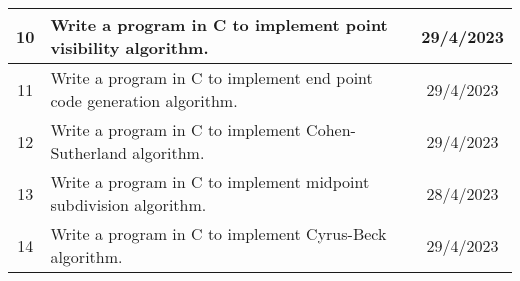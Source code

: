 \documentclass{article}
\begin{document}
\begin{longtable}{|c|p{6cm}|c|}
        10 & Write a program in C to implement point visibility algorithm. & 29/4/2023 \\ \hline
        11 & Write a program in C to implement end point code generation algorithm. & 29/4/2023 \\ \hline
        12 & Write a program in C to implement Cohen-Sutherland algorithm. & 29/4/2023 \\ \hline
        13 & Write a program in C to implement midpoint subdivision algorithm. & 28/4/2023 \\ \hline
        14 & Write a program in C to implement Cyrus-Beck algorithm. & 29/4/2023 \\ \hline
    \end{longtable}
\end{document}
